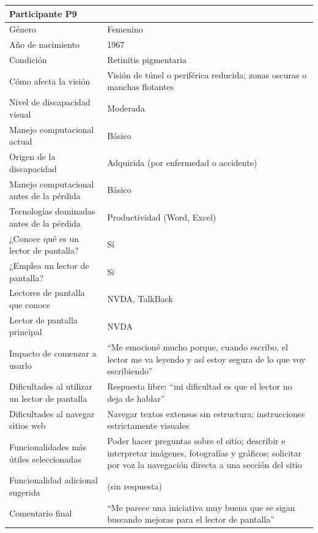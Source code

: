 \begin{longtable}{|p{4cm}|p{10.5cm}|}
    \multicolumn{2}{|l|}{\textbf{Participante P9}} \\
    \hline
    Género & Femenino \\
    \hline
    Año de nacimiento & 1967 \\
    \hline
    Condición & Retinitis pigmentaria \\
    \hline
    Cómo afecta la visión & Visión de túnel o periférica reducida; zonas oscuras o manchas flotantes \\
    \hline
    Nivel de discapacidad visual & Moderada \\
    \hline
    Manejo computacional actual & Básico \\
    \hline
    Origen de la discapacidad & Adquirida (por enfermedad o accidente) \\
    \hline
    Manejo computacional antes de la pérdida & Básico \\
    \hline
    Tecnologías dominadas antes de la pérdida & Productividad (Word, Excel) \\
    \hline
    ¿Conoce qué es un lector de pantalla? & Sí \\
    \hline
    ¿Emplea un lector de pantalla? & Sí \\
    \hline
    Lectores de pantalla que conoce & NVDA, TalkBack \\
    \hline
    Lector de pantalla principal & NVDA \\
    \hline
    Impacto de comenzar a usarlo & ``Me emocioné mucho porque, cuando escribo, el lector me va leyendo y así estoy segura de lo que voy escribiendo'' \\
    \hline
    Dificultades al utilizar un lector de pantalla & Respuesta libre: ``mi dificultad es que el lector no deja de hablar'' \\
    \hline
    Dificultades al navegar sitios web & Navegar textos extensos sin estructura; instrucciones estrictamente visuales \\
    \hline
    Funcionalidades más útiles seleccionadas & Poder hacer preguntas sobre el sitio; describir e interpretar imágenes, fotografías y gráficos; solicitar por voz la navegación directa a una sección del sitio \\
    \hline
    Funcionalidad adicional sugerida & (sin respuesta) \\
    \hline
    Comentario final & ``Me parece una iniciativa muy buena que se sigan buscando mejoras para el lector de pantalla'' \\
    \hline
\end{longtable}

